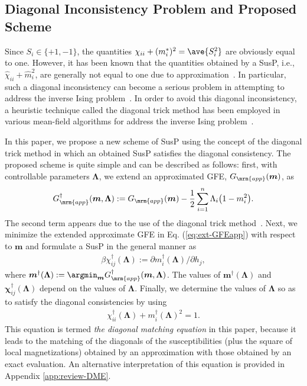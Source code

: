 \documentclass[%
 reprint,
 amsmath,amssymb,
 aps, 
 pre,
 showkeys
]{revtex4-1}
\begin{document}
\subsection{Diagonal Inconsistency Problem and Proposed Scheme} \label{SubSec:DIP&OurScheme}

Since $S_i \in \{+1,-1\}$, the quantities $\chi_{ii} + (m_i^*)^2 = \ave{S_i^2}$ are obviously equal to one. 
However, it has been known that the quantities obtained by a SusP, i.e., $\hat{\chi}_{ii} + \hat{m}_i^2$, are generally not equal to one due to approximation~\cite{Yasuda&Tanaka2007}. 
In particular, such a diagonal inconsistency can become a serious problem in attempting to address the inverse Ising problem~\cite{Yasuda&Tanaka2009}. 
In order to avoid this diagonal inconsistency, a heuristic technique called the diagonal trick method has been employed 
in various mean-field algorithms for address the inverse Ising problem~\cite{KR1998, T.Tanaka1998, Yasuda&Tanaka2009}. 

In this paper, we propose a new scheme of SusP using the concept of the diagonal trick method in which an obtained SusP satisfies the diagonal consistency. 
The proposed scheme is quite simple and can be described as follows:
first, with controllable parameters $\bm{\Lambda}$, we extend an approximated GFE, $G_{\mrm{app}}(\bm{m})$, as 
\begin{align}
G_{\mrm{app}}^{\dagger}(\bm{m}, \bm{\Lambda}):= G_{\mrm{app}}(\bm{m}) - \frac{1}{2}\sum_{i=1}^n \Lambda_i\big(1- m_i^2\big).
\label{eq:ext-GFEapp}
\end{align}
The second term appears due to the use of the diagonal trick method~\cite{Yasuda&Tanaka2009}. 
Next, we minimize the extended approximate GFE in Eq. (\ref{eq:ext-GFEapp}) with respect to $\bm{m}$ and formulate a SusP in the general manner as 
\begin{align}
\beta \chi_{ij}^{\dagger}(\bm{\Lambda}):= \partial m_i^{\dagger}(\bm{\Lambda}) /\partial h_j, 
\label{eq:ext-SusP}
\end{align}
where $\bm{m}^{\dagger}(\bm{\Lambda}):= \argmin_{\bm{m}} G_{\mrm{app}}^{\dagger}(\bm{m}, \bm{\Lambda})$.
The values of $\bm{m}^{\dagger}(\bm{\Lambda})$ and $\bm{\chi}_{ij}^{\dagger}(\bm{\Lambda})$ depend on the values of $\bm{\Lambda}$. 
Finally, we determine the values of $\bm{\Lambda}$ so as to satisfy the diagonal consistencies by using
\begin{align}
\chi_{ii}^{\dagger}(\bm{\Lambda}) + m_i^{\dagger}(\bm{\Lambda})^2 = 1.
\label{eq:DiagConsist}
\end{align}
This equation is termed \textit{the diagonal matching equation} in this paper, 
because it leads to the matching of the diagonals of the susceptibilities (plus the square of local magnetizations) 
obtained by an approximation with those obtained by an exact evaluation. 
An alternative interpretation of this equation is provided in Appendix \ref{app:review-DME}.
\end{document}
